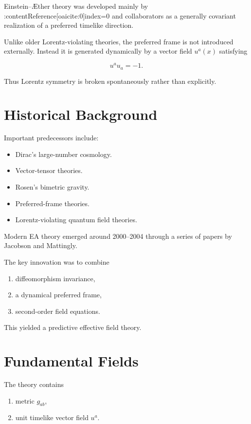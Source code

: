 \documentclass[11pt,a4paper]{article}
\begin{document}
Einstein--\AE ther theory was developed mainly by
:contentReference[oaicite:0]{index=0}
and collaborators as a generally covariant realization of a preferred
timelike direction.

Unlike older Lorentz-violating theories, the preferred frame is not
introduced externally.
Instead it is generated dynamically by a vector field
$u^a(x)$ satisfying

\begin{equation}
u^a u_a = -1.
\end{equation}

Thus Lorentz symmetry is broken spontaneously rather than explicitly.

\section{Historical Background}

Important predecessors include:

\begin{itemize}
\item Dirac's large-number cosmology.
\item Vector-tensor theories.
\item Rosen's bimetric gravity.
\item Preferred-frame theories.
\item Lorentz-violating quantum field theories.
\end{itemize}

Modern EA theory emerged around 2000--2004 through a series of papers by
Jacobson and Mattingly.

The key innovation was to combine

\begin{enumerate}
\item diffeomorphism invariance,
\item a dynamical preferred frame,
\item second-order field equations.
\end{enumerate}

This yielded a predictive effective field theory.

\section{Fundamental Fields}

The theory contains

\begin{enumerate}
\item metric $g_{ab}$,
\item unit timelike vector field $u^a$.
\end{enumerate}
\end{document}
